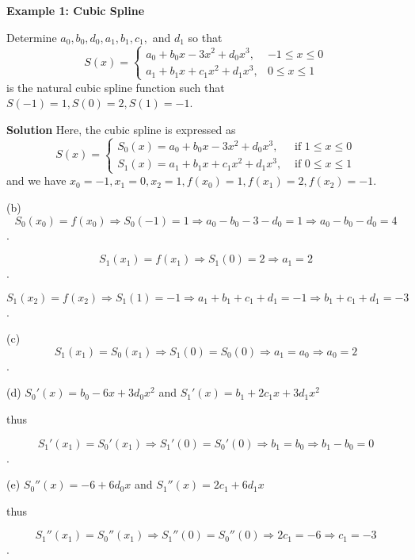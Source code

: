 \documentclass [titlepage,12pt,letter] {article}
\begin{document}
\noindent
{\bf Example 1: Cubic Spline}

\noindent
Determine $a_0,b_0,d_0,a_1,b_1,c_1,$ and $d_1$ so that
\[
S(x) = \left\{
\begin{array}{ll}
     a_0+b_0x-3x^2+d_0x^3, & -1 \leq x\leq 0 \\
     a_1+b_1x+c_1x^2+d_1x^3, & 0 \leq x\leq 1 
\end{array}
\right. \]
is the natural cubic spline function such that $S(-1)=1, S(0)=2,S(1)=-1$.

\noindent
{\bf Solution}
Here, the cubic spline is expressed as
\[
S(x) = \begin{cases}
S_0(x)=a_0+b_0x-3x^2+d_0x^3, & \text{ if } 1 \leq x \leq 0 \\
S_1(x)=a_1+b_1x+c_1x^2+d_1x^3, & \text{ if } 0 \leq x \leq 1
\end{cases}
\]
and we have $x_0=-1,x_1=0,x_2=1,f(x_0)=1,f(x_1)=2,f(x_2)=-1$.

(b) \begin{equation}S_0(x_0)=f(x_0) \Rightarrow S_0(-1)=1 \Rightarrow a_0-b_0-3-d_0=1 \Rightarrow \boxed{a_0-b_0-d_0=4}\end{equation}.

\begin{equation}S_1(x_1)=f(x_1) \Rightarrow S_1(0)=2 \Rightarrow \boxed{a_1=2}\end{equation}.

\begin{equation}S_1(x_2)=f(x_2) \Rightarrow S_1(1)=-1 \Rightarrow a_1+b_1+c_1+d_1=-1 \Rightarrow \boxed{b_1+c_1+d_1=-3} \end{equation}.

(c) \begin{equation}S_1(x_1)=S_0(x_1) \Rightarrow S_1(0)=S_0(0) \Rightarrow a_1=a_0 \Rightarrow \boxed{a_0=2}\end{equation}.

(d) $S_0'(x) = b_0 -6x+3d_0x^2$ and $S_1'(x)=b_1+2c_1x+3d_1x^2$

thus

\begin{equation}S_1'(x_1)=S_0'(x_1) \Rightarrow S_1'(0)=S_0'(0) \Rightarrow b_1=b_0 \Rightarrow \boxed{b_1-b_0=0}\end{equation}.

(e)  $S_0''(x) = -6+6d_0x$ and $S_1''(x)=2c_1+6d_1x$

thus

\begin{equation}S_1''(x_1)=S_0''(x_1) \Rightarrow S_1''(0)=S_0''(0) \Rightarrow 2c_1=-6 \Rightarrow \boxed{c_1=-3}\end{equation}.
\end{document}
